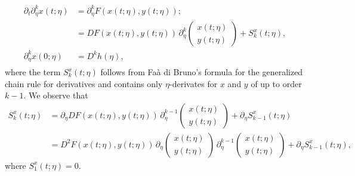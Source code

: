 \documentclass[a4paper]{siamart190516}
\begin{document}
 \begin{align}
 \begin{split}
 \partial_t \partial^k_{\eta} x(t;\eta)&= \partial^k_{\eta} F(x(t;\eta),y(t;\eta)); \\
 &= D F(x(t;\eta), y(t;\eta))\,  \partial^k_\eta \begin{pmatrix} x(t; \eta) \\ y(t;\eta) \end{pmatrix} + S^x_{k}(t; \eta), \\
\partial^k_\eta x(0; \eta) &= D^k h(\eta),
 \end{split}
 \end{align}
 where the term $S^x_{k}(t; \eta)$ follows from Fa\`a di Bruno's formula for the generalized chain rule for derivatives and contains only $\eta$-derivates for $x$ and $y$ of up to order $k-1$. We observe that
 \begin{equation}
 \begin{aligned}
 S^x_k(t; \eta) &=  \partial_{\eta} DF(x(t;\eta),y(t;\eta)) \, \partial^{k-1}_\eta \begin{pmatrix} x(t; \eta) \\  y(t;\eta) \end{pmatrix} + \partial_{\eta} S^x_{k-1}(t; \eta) \\
 &= D^2F(x(t;\eta),y(t;\eta))  \,  \partial_\eta \begin{pmatrix} x(t; \eta) \\  y(t;\eta) \end{pmatrix} \,  \partial^{k-1}_\eta \begin{pmatrix}  x(t; \eta)\\  y(t;\eta) \end{pmatrix} + \partial_{\eta} S^x_{k-1}(t; \eta),
 \end{aligned}
 \end{equation}
 where $S^x_1(t;\eta) = 0$.
 
\end{document}
